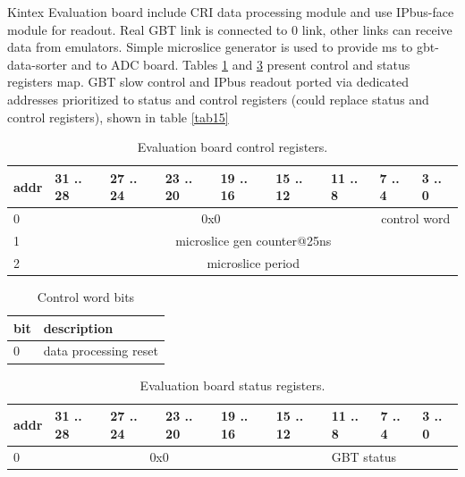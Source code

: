 \documentclass{article}
\begin{document}
Kintex Evaluation board include CRI data processing module and use IPbus-face module for readout. Real GBT link is connected to 0 link, other links can receive data from emulators. Simple microslice generator is used to provide ms to gbt-data-sorter and to ADC board. Tables \ref{tab11} and \ref{tab13} present control and status registers map. GBT slow control and IPbus readout ported via dedicated addresses prioritized to status and control registers (could replace status and control registers), shown in table \ref{tab15} 



\begin{table}[H]
\centering
\begin{tabular}{| l | l | l | l | l | l | l | l | l |}
\hline
addr & 31 .. 28 & 27 .. 24 & 23 .. 20 & 19 .. 16 & 15 .. 12 & 11 .. 8 & 7 .. 4 & 3 .. 0 \\ \hline
0 & \multicolumn{6}{c|}{0x0}  & \multicolumn{2}{c|}{control word} \\ \hline
1 & \multicolumn{8}{c|}{microslice gen counter@25ns}  \\ \hline
2 & \multicolumn{8}{c|}{microslice period}  \\ \hline
\end{tabular}
\caption{Evaluation board control registers.\label{tab11}}
\end{table}

\begin{table}[H]
\centering
\begin{tabular}{| l | l |}
\hline
bit & description \\ \hline
0 & data processing reset \\ \hline

\end{tabular}
\caption{Control word bits\label{tab12}}
\end{table}


\begin{table}[H]
\centering
\begin{tabular}{| l | l | l | l | l | l | l | l | l |}
\hline
addr & 31 .. 28 & 27 .. 24 & 23 .. 20 & 19 .. 16 & 15 .. 12 & 11 .. 8 & 7 .. 4 & 3 .. 0 \\ \hline
0 & \multicolumn{4}{c|}{0x0}  & \multicolumn{4}{c|}{GBT status} \\ \hline

\end{tabular}
\caption{Evaluation board status registers.\label{tab13}}
\end{table}
\end{document}
